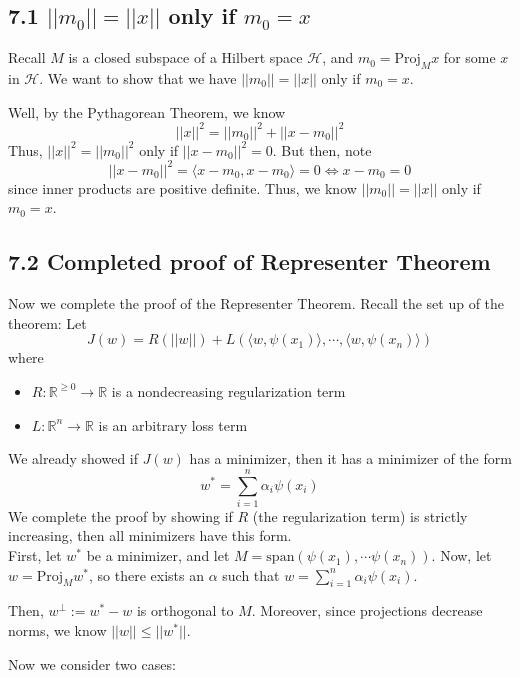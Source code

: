 \documentclass[paper=a4, fontsize=11pt]{scrartcl} %
\numberwithin{equation}{section} %
\numberwithin{figure}{section} %
\numberwithin{table}{section} %
\begin{document}
\subsection*{7.1 $||m_0|| = ||x||$ only if $m_0 = x$}

Recall $M$ is a closed subspace of a Hilbert space $\mathcal{H}$, and $m_0 = \textrm{Proj}_Mx$ for some $x$ in $\mathcal{H}$. We want to show that we have $||m_0|| = ||x||$ only if $m_0 = x$. 

Well, by the Pythagorean Theorem, we know
\[||x||^2 = ||m_0||^2 + ||x - m_0||^2\]
Thus, $||x||^2 = ||m_0||^2$ only if $||x - m_0||^2 = 0$. But then, note
\[||x - m_0||^2 = \langle  x - m_0, x - m_0 \rangle = 0 \iff x - m_0 = 0\]
since inner products are positive definite. Thus, we know $||m_0|| = ||x||$ only if $m_0 = x$.

\subsection*{7.2 Completed proof of Representer Theorem}

Now we complete the proof of the Representer Theorem. Recall the set up of the theorem: Let
\[J(w) = R(||w||) + L(\langle w, \psi(x_1)\rangle, \cdots, \langle w, \psi(x_n)\rangle)\]
where
\begin{itemize}
\item $R: \mathbb{R}^{\geq 0} \to \mathbb{R}$ is a nondecreasing regularization term
\item $L: \mathbb{R}^{n} \to \mathbb{R}$ is an arbitrary loss term
\end{itemize}

We already showed  if $J(w)$ has a minimizer, then it has a minimizer of the form 
\[w^* = \sum_{i = 1}^n \alpha_i \psi(x_i)\]
We complete the proof by showing if $R$ (the regularization term) is strictly increasing, then all minimizers have this form. 
\\

First, let $w^*$ be a minimizer, and let $M = \textrm{span}(\psi(x_1), \cdots \psi(x_n))$. Now, let $w = \textrm{Proj}_Mw^*$, so  there exists an $\alpha$ such that $w = \sum_{i = 1}^n \alpha_i \psi(x_i)$.

Then, $w^\perp := w^* - w$ is orthogonal to $M$. Moreover, since projections decrease norms, we know $||w|| \leq ||w^*||$.

Now we consider two cases:
\end{document}

